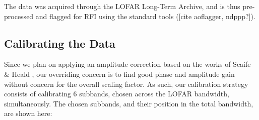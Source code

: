 \pg
The data was acquired through the LOFAR Long-Term Archive, and is thus pre-processed and flagged for RFI using the standard tools ([cite aoflagger, ndppp?]). 

\subsection{Calibrating the Data}
\pg
Since we plan on applying an amplitude correction based on the works of Scaife \& Heald \citep[see][]{arse}, our overriding concern is to find good phase and amplitude gain without concern for the overall scaling factor. As such, our calibration strategy consists of calibrating 6 subbands, chosen across the LOFAR bandwidth, simultaneously. The chosen subbands, and their position in the total bandwidth, are shown here:
\begin{figure}[h]
\begin{floatrow}
\end{floatrow}
\end{figure}

